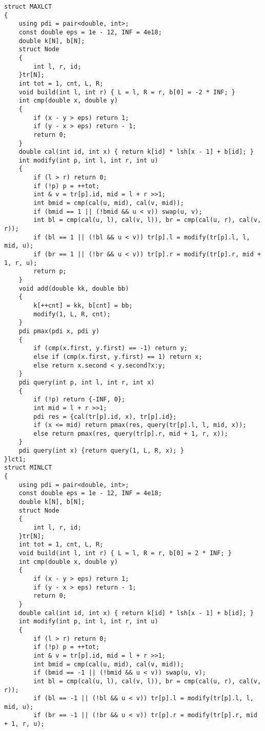 \documentclass[a4paper, fontset=none]{ctexart}
\begin{document}
\begin{verbatim}
struct MAXLCT
{
    using pdi = pair<double, int>;
    const double eps = 1e - 12, INF = 4e18;
    double k[N], b[N];
    struct Node
    {
        int l, r, id;
    }tr[N];
    int tot = 1, cnt, L, R;
    void build(int l, int r) { L = l, R = r, b[0] = -2 * INF; }
    int cmp(double x, double y)
    {
        if (x - y > eps) return 1;
        if (y - x > eps) return - 1;
        return 0;
    }
    double cal(int id, int x) { return k[id] * lsh[x - 1] + b[id]; }
    int modify(int p, int l, int r, int u)
    {
        if (l > r) return 0;
        if (!p) p = ++tot;
        int & v = tr[p].id, mid = l + r >>1;
        int bmid = cmp(cal(u, mid), cal(v, mid));
        if (bmid == 1 || (!bmid && u < v)) swap(u, v);
        int bl = cmp(cal(u, l), cal(v, l)), br = cmp(cal(u, r), cal(v, r));
        if (bl == 1 || (!bl && u < v)) tr[p].l = modify(tr[p].l, l, mid, u);
        if (br == 1 || (!br && u < v)) tr[p].r = modify(tr[p].r, mid + 1, r, u);
        return p;
    }
    void add(double kk, double bb)
    {
        k[++cnt] = kk, b[cnt] = bb;
        modify(1, L, R, cnt);
    }
    pdi pmax(pdi x, pdi y)
    {
        if (cmp(x.first, y.first) == -1) return y;
        else if (cmp(x.first, y.first) == 1) return x;
        else return x.second < y.second?x:y;
    }
    pdi query(int p, int l, int r, int x)
    {
        if (!p) return {-INF, 0};
        int mid = l + r >>1;
        pdi res = {cal(tr[p].id, x), tr[p].id};
        if (x <= mid) return pmax(res, query(tr[p].l, l, mid, x));
        else return pmax(res, query(tr[p].r, mid + 1, r, x));
    }
    pdi query(int x) {return query(1, L, R, x); }
}lct1;
struct MINLCT
{
    using pdi = pair<double, int>;
    const double eps = 1e - 12, INF = 4e18;
    double k[N], b[N];
    struct Node
    {
        int l, r, id;
    }tr[N];
    int tot = 1, cnt, L, R;
    void build(int l, int r) { L = l, R = r, b[0] = 2 * INF; }
    int cmp(double x, double y)
    {
        if (x - y > eps) return 1;
        if (y - x > eps) return - 1;
        return 0;
    }
    double cal(int id, int x) { return k[id] * lsh[x - 1] + b[id]; }
    int modify(int p, int l, int r, int u)
    {
        if (l > r) return 0;
        if (!p) p = ++tot;
        int & v = tr[p].id, mid = l + r >>1;
        int bmid = cmp(cal(u, mid), cal(v, mid));
        if (bmid == -1 || (!bmid && u < v)) swap(u, v);
        int bl = cmp(cal(u, l), cal(v, l)), br = cmp(cal(u, r), cal(v, r));
        if (bl == -1 || (!bl && u < v)) tr[p].l = modify(tr[p].l, l, mid, u);
        if (br == -1 || (!br && u < v)) tr[p].r = modify(tr[p].r, mid + 1, r, u);

\end{verbatim}
\end{document}
